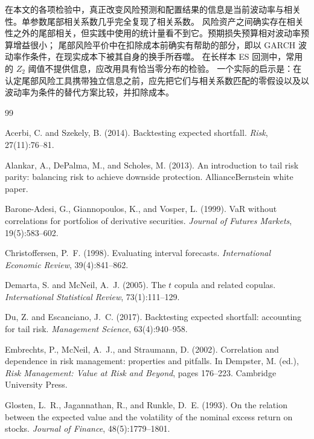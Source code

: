 \documentclass[11pt,UTF8]{ctexart}
\newcommand{\1}{\mathbf{1}}
\begin{document}
在本文的各项检验中，真正改变风险预测和配置结果的信息是当前波动率与相关性。单参数尾部相关系数几乎完全复现了相关系数。
风险资产之间确实存在相关性之外的尾部相关，但实践中使用的统计量看不到它。预期损失预算相对波动率预算增益很小；
尾部风险平价中在扣除成本前确实有帮助的部分，即以 GARCH 波动率作条件，在现实成本下被其自身的换手所吞噬。
在长样本 ES 回测中，常用的 $Z_2$ 阈值不提供信息，应改用具有恰当零分布的检验。
一个实际的启示是：在认定尾部风险工具携带独立信息之前，应先把它们与相关系数匹配的零假设以及以波动率为条件的替代方案比较，并扣除成本。


\begin{thebibliography}{99}

Acerbi, C. and Szekely, B. (2014). Backtesting expected shortfall. \emph{Risk}, 27(11):76--81.

Alankar, A., DePalma, M., and Scholes, M. (2013). An introduction to tail risk parity: balancing risk to
achieve downside protection. AllianceBernstein white paper.

Barone-Adesi, G., Giannopoulos, K., and Vosper, L. (1999). VaR without correlations for portfolios of
derivative securities. \emph{Journal of Futures Markets}, 19(5):583--602.

Christoffersen, P.~F. (1998). Evaluating interval forecasts. \emph{International Economic Review},
39(4):841--862.

Demarta, S. and McNeil, A.~J. (2005). The $t$ copula and related copulas. \emph{International Statistical
Review}, 73(1):111--129.

Du, Z. and Escanciano, J.~C. (2017). Backtesting expected shortfall: accounting for tail risk.
\emph{Management Science}, 63(4):940--958.

Embrechts, P., McNeil, A.~J., and Straumann, D. (2002). Correlation and dependence in risk management:
properties and pitfalls. In Dempster, M. (ed.), \emph{Risk Management: Value at Risk and Beyond}, pages
176--223. Cambridge University Press.

Glosten, L.~R., Jagannathan, R., and Runkle, D.~E. (1993). On the relation between the expected value and
the volatility of the nominal excess return on stocks. \emph{Journal of Finance}, 48(5):1779--1801.


\end{thebibliography}
\end{document}
